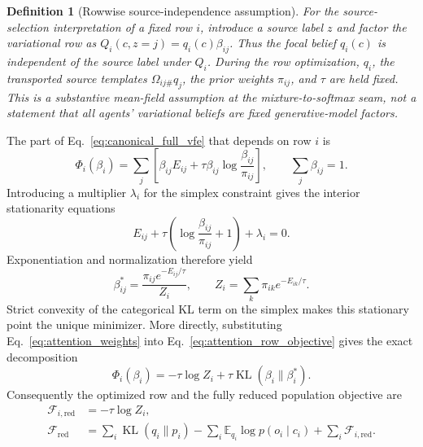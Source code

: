 \documentclass[12pt]{article}
\newcommand{\KL}{\operatorname{KL}}
\newtheorem{definition}[theorem]{Definition}
\begin{document}
\begin{definition}[Rowwise source-independence assumption]
For the source-selection interpretation of a fixed row $i$, introduce a source label $z$ and factor the variational row as $Q_i(c,z=j)=q_i(c)\beta_{ij}$. Thus the focal belief $q_i(c)$ is independent of the source label under $Q_i$. During the row optimization, $q_i$, the transported source templates $\Omega_{ij\#}q_j$, the prior weights $\pi_{ij}$, and $\tau$ are held fixed. This is a substantive mean-field assumption at the mixture-to-softmax seam, not a statement that all agents' variational beliefs are fixed generative-model factors.
\end{definition}

The part of Eq.~\eqref{eq:canonical_full_vfe} that depends on row $i$ is
\begin{equation}
\Phi_i(\beta_i)
=\sum_j\left[
\beta_{ij}E_{ij}
+\tau\beta_{ij}\log\frac{\beta_{ij}}{\pi_{ij}}
\right],
\qquad
\sum_j\beta_{ij}=1.
\label{eq:attention_row_objective}
\end{equation}
Introducing a multiplier $\lambda_i$ for the simplex constraint gives the interior stationarity equations
\begin{equation}
E_{ij}+\tau\left(\log\frac{\beta_{ij}}{\pi_{ij}}+1\right)+\lambda_i=0.
\label{eq:attention_row_stationarity}
\end{equation}
Exponentiation and normalization therefore yield
\begin{equation}
\boxed{
\beta_{ij}^*=\frac{\pi_{ij}e^{-E_{ij}/\tau}}{Z_i},
\qquad
Z_i=\sum_k\pi_{ik}e^{-E_{ik}/\tau}.}
\label{eq:attention_weights}
\end{equation}
Strict convexity of the categorical KL term on the simplex makes this stationary point the unique minimizer. More directly, substituting Eq.~\eqref{eq:attention_weights} into Eq.~\eqref{eq:attention_row_objective} gives the exact decomposition
\begin{equation}
\Phi_i(\beta_i)
=-\tau\log Z_i+\tau\KL(\beta_i\|\beta_i^*).
\label{eq:attention_row_kl_decomposition}
\end{equation}
Consequently the optimized row and the fully reduced population objective are
\begin{align}
\mathcal F_{i,\mathrm{red}}&=-\tau\log Z_i,
\label{eq:canonical_row_reduced_vfe}\\
\mathcal F_{\mathrm{red}}
&=\sum_i\KL(q_i\|p_i)
-\sum_i\mathbb E_{q_i}\log p(o_i\mid c_i)
+\sum_i\mathcal F_{i,\mathrm{red}}.
\label{eq:canonical_reduced_vfe}
\end{align}
\end{document}
